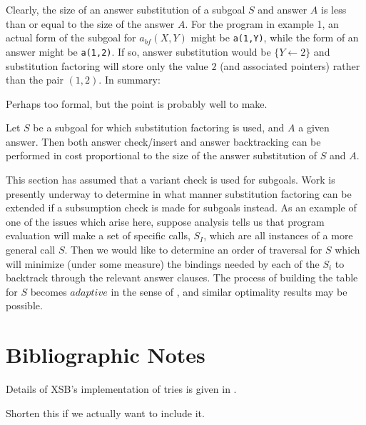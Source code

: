 Clearly, the size of an answer substitution of a subgoal $S$ and
answer $A$ is less than or equal to the size of the answer $A$.  For
the program in example 1, an actual form of the subgoal for
$a_{bf}(X,Y)$ might be {\tt a(1,Y)}, while the form of an answer might
be {\tt a(1,2)}.  If so, answer substitution would be $\{Y \leftarrow
2 \}$ and substitution factoring will store only the value $2$ (and
associated pointers) rather than the pair $(1,2)$. In summary:

Perhaps too formal, but the point is probably well to make.

\begin{proposition} \rm
Let $S$ be a subgoal for which substitution factoring is used,
and $A$ a given answer.  Then both answer check/insert and
answer backtracking can be performed in cost proportional to
the size of the answer substitution of $S$ and $A$.
\end{proposition}


This section has assumed that a variant check is used for subgoals.
Work is presently underway to determine in what manner substitution
factoring can be extended if a subsumption check is made for subgoals
instead.  As an example of one of the issues which arise here, suppose
analysis tells us that program evaluation will make a set of specific
calls, $S_I$, which are all instances of a more general call $S$.
Then we would like to determine an order of traversal for $S$ which
will minimize (under some measure) the bindings needed by each of the
$S_i$ to backtrack through the relevant answer clauses.  The process
of building the table for $S$ becomes $adaptive$ in the sense of
\cite{SRR94}, and similar optimality results may be possible.

\section*{Bibliographic Notes}

Details of XSB's implementation of tries is given in \cite{RRSSW94}.

Shorten this if we actually want to include it.

